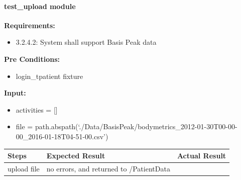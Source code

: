 \documentclass[letterpaper,10pt,english]{sphinxmanual}
\begin{document}
\paragraph{test\_upload module}
\label{STD/test_upload:test-upload-module}\label{STD/test_upload::doc}\label{STD/test_upload:module-test_upload}

\begin{fulllineitems}
\label{STD/test_upload:test_upload.test_basis_data_upload}
\textbf{Requirements:}
\begin{itemize}
\item {} 
3.2.4.2: System shall support Basis Peak data

\end{itemize}

\textbf{Pre Conditions:}
\begin{itemize}
\item {} 
login\_tpatient fixture

\end{itemize}

\textbf{Input:}
\begin{itemize}
\item {} 
activities = {[}{]}

\item {} 
file = path.abspath(`./Data/BasisPeak/bodymetrics\_2012-01-30T00-00-00\_2016-01-18T04-51-00.csv')

\end{itemize}

\begin{tabulary}{\linewidth}{|L|L|L|}
\hline
\textsf{\relax 
Steps
} & \textsf{\relax 
Expected Result
} & \textsf{\relax 
Actual Result
}\\
\hline
upload file
 & 
no errors, and returned to /PatientData
 & \\
\hline\end{tabulary}


\end{fulllineitems}

\end{document}
